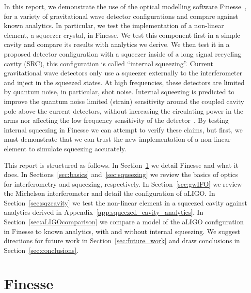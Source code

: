 \documentclass[aps,pra,superscriptaddress,reprint,nofootinbib]{revtex4-1}
\begin{document}
In this report, we demonstrate the use of the optical modelling software Finesse~\cite{finesse}, for a variety of gravitational wave detector configurations and compare against known analytics. In particular, we test the implementation of a non-linear element, a squeezer crystal, in Finesse.
We test this component first in a simple cavity and compare its results with analytics we derive. We then test it in a proposed detector configuration with a squeezer inside of a long signal recycling cavity (SRC), this configuration is called ``internal squeezing''.
Current gravitational wave detectors only use a squeezer externally to the interferometer and inject in the squeezed states.
At high frequencies, these detectors are limited by quantum noise, in particular, shot noise. Internal squeezing is predicted to improve the quantum noise limited (strain) sensitivity around the coupled cavity pole above the current detectors, without increasing the circulating power in the arms nor affecting the low frequency sensitivity of the detector~\cite{Korobko_2019,Adya_2020}.
By testing internal squeezing in Finesse we can attempt to verify these claims, but first, we must demonstrate that we can trust the new implementation of a non-linear element to simulate squeezing accurately.


This report is structured as follows.
In Section~\ref{sec:Finesse} we detail Finesse and what it does.
In Sections~\ref{sec:basics} and~\ref{sec:squeezing} we review the basics of optics for interferometry and squeezing, respectively. In Section~\ref{sec:gwIFO} we review the Michelson interferometer and detail the configuration of aLIGO.
In Section~\ref{sec:sqzcavity} we test the non-linear element in a squeezed cavity against analytics derived in Appendix~\ref{app:squeezed_cavity_analytics}. 
In Section~\ref{sec:aLIGOcomparison} we compare a model of the aLIGO configuration in Finesse to known analytics, with and without internal squeezing.
We suggest directions for future work in Section~\ref{sec:future_work} and draw conclusions in Section~\ref{sec:conclusions}.


\section{Finesse} %
\label{sec:Finesse}
\end{document}
